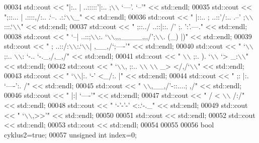 \begin{DoxyCode}
00034 std::cout << \textcolor{stringliteral}{"|:..   |  ..:::::'|:..  ;\(\backslash\)\(\backslash\) `---'. `--'"}          << std::endl;
00035 std::cout << \textcolor{stringliteral}{";::... |   .::::,/:..    .`--.   .:.`\(\backslash\)\(\backslash\)\_"}         << std::endl;
00036 std::cout << \textcolor{stringliteral}{" |::.. ;  ..::'/:..   .--'    ;\(\backslash\)\(\backslash\)   :::.`\(\backslash\)\(\backslash\)"}      << std::endl;
00037 std::cout << \textcolor{stringliteral}{" ;::../   ..::|::.  /'          ;.  ':'.---."}     << std::endl;
00038 std::cout << \textcolor{stringliteral}{"  `--|    ..::;\(\backslash\)\(\backslash\):.  `\(\backslash\)\(\backslash\),,,\_\_\_\_,,,/';\(\backslash\)\(\backslash\). (\_)  |)"} << std::endl;
00039 std::cout << \textcolor{stringliteral}{"     ;     ..::/:\(\backslash\)\(\backslash\):.`\(\backslash\)\(\backslash\)|         ,\_\_,/`;----'"}   << std::endl;
00040 std::cout << \textcolor{stringliteral}{"     `\(\backslash\)\(\backslash\)       ;:.. \(\backslash\)\(\backslash\): `-..      `-.\_,/,\_,/"}     << std::endl;
00041 std::cout << \textcolor{stringliteral}{"       \(\backslash\)\(\backslash\)      ;:.   ). `\(\backslash\)\(\backslash\) `>     \_:\(\backslash\)\(\backslash\)"}          << std::endl;
00042 std::cout << \textcolor{stringliteral}{"        `\(\backslash\)\(\backslash\),  ;:..    \(\backslash\)\(\backslash\) \(\backslash\)\(\backslash\) \_>     </,/`\(\backslash\)\(\backslash\)"}       << std::endl;
00043 std::cout << \textcolor{stringliteral}{"           `\(\backslash\)\(\backslash\)|:.      `-'      <\_/:.  |"}         << std::endl;
00044 std::cout << \textcolor{stringliteral}{"             ;:     |:.  `----':.    /"}           << std::endl;
00045 std::cout << \textcolor{stringliteral}{"              \(\backslash\)\(\backslash\),\_\_,/'-::....;      ,/"}           << std::endl;
00046 std::cout << \textcolor{stringliteral}{"               |:|          `----'"}               << std::endl;
00047 std::cout << \textcolor{stringliteral}{"               / < \(\backslash\)\(\backslash\)          /:/"}               << std::endl;
00048 std::cout << \textcolor{stringliteral}{"              `-'-'-'        <:.`-.\_"}             << std::endl;
00049 std::cout << \textcolor{stringliteral}{"                               `\(\backslash\)\(\backslash\),>>'"}           << std::endl;
00050 
00051 std::cout << std::endl;
00052 std::cout << std::endl;
00053 std::cout << std::endl;
00054 
00055 
00056     \textcolor{keywordtype}{bool} cyklus2=\textcolor{keyword}{true};
00057     \textcolor{keywordtype}{unsigned} \textcolor{keywordtype}{int} index=0;

\end{DoxyCode}
